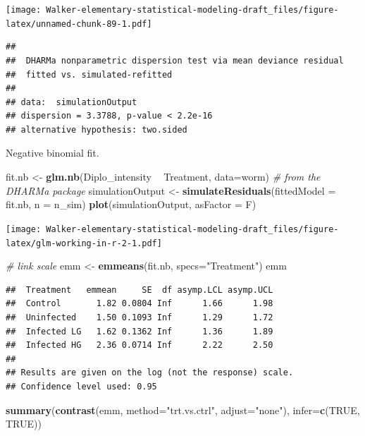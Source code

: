 \documentclass[]{book}
\newenvironment{Shaded}{\begin{snugshade}}{\end{snugshade}}
\newcommand{\KeywordTok}[1]{\textcolor[rgb]{0.13,0.29,0.53}{\textbf{#1}}}
\newcommand{\DataTypeTok}[1]{\textcolor[rgb]{0.13,0.29,0.53}{#1}}
\newcommand{\StringTok}[1]{\textcolor[rgb]{0.31,0.60,0.02}{#1}}
\newcommand{\CommentTok}[1]{\textcolor[rgb]{0.56,0.35,0.01}{\textit{#1}}}
\newcommand{\OtherTok}[1]{\textcolor[rgb]{0.56,0.35,0.01}{#1}}
\newcommand{\OperatorTok}[1]{\textcolor[rgb]{0.81,0.36,0.00}{\textbf{#1}}}
\newcommand{\NormalTok}[1]{#1}
\begin{document}
\texttt{[image: Walker-elementary-statistical-modeling-draft\_files/figure-latex/unnamed-chunk-89-1.pdf]}

\begin{verbatim}
## 
##  DHARMa nonparametric dispersion test via mean deviance residual
##  fitted vs. simulated-refitted
## 
## data:  simulationOutput
## dispersion = 3.3788, p-value < 2.2e-16
## alternative hypothesis: two.sided
\end{verbatim}

Negative binomial fit.

\begin{Shaded}
\begin{Highlighting}[]
\NormalTok{fit.nb <-}\StringTok{ }\KeywordTok{glm.nb}\NormalTok{(Diplo_intensity }\OperatorTok{~}\StringTok{ }\NormalTok{Treatment, }\DataTypeTok{data=}\NormalTok{worm)}
\CommentTok{# from the DHARMa package}
\NormalTok{  simulationOutput <-}\StringTok{ }\KeywordTok{simulateResiduals}\NormalTok{(}\DataTypeTok{fittedModel =}\NormalTok{ fit.nb, }\DataTypeTok{n =}\NormalTok{ n_sim)}
  \KeywordTok{plot}\NormalTok{(simulationOutput, }\DataTypeTok{asFactor =}\NormalTok{ F)}
\end{Highlighting}
\end{Shaded}

\texttt{[image: Walker-elementary-statistical-modeling-draft\_files/figure-latex/glm-working-in-r-2-1.pdf]}

\begin{Shaded}
\begin{Highlighting}[]
\CommentTok{# link scale}
\NormalTok{emm <-}\StringTok{ }\KeywordTok{emmeans}\NormalTok{(fit.nb, }\DataTypeTok{specs=}\StringTok{"Treatment"}\NormalTok{)}
\NormalTok{emm}
\end{Highlighting}
\end{Shaded}

\begin{verbatim}
##  Treatment   emmean     SE  df asymp.LCL asymp.UCL
##  Control       1.82 0.0804 Inf      1.66      1.98
##  Uninfected    1.50 0.1093 Inf      1.29      1.72
##  Infected LG   1.62 0.1362 Inf      1.36      1.89
##  Infected HG   2.36 0.0714 Inf      2.22      2.50
## 
## Results are given on the log (not the response) scale. 
## Confidence level used: 0.95
\end{verbatim}

\begin{Shaded}
\begin{Highlighting}[]
\KeywordTok{summary}\NormalTok{(}\KeywordTok{contrast}\NormalTok{(emm, }\DataTypeTok{method=}\StringTok{"trt.vs.ctrl"}\NormalTok{, }\DataTypeTok{adjust=}\StringTok{"none"}\NormalTok{), }\DataTypeTok{infer=}\KeywordTok{c}\NormalTok{(}\OtherTok{TRUE}\NormalTok{, }\OtherTok{TRUE}\NormalTok{))}
\end{Highlighting}
\end{Shaded}
\end{document}
